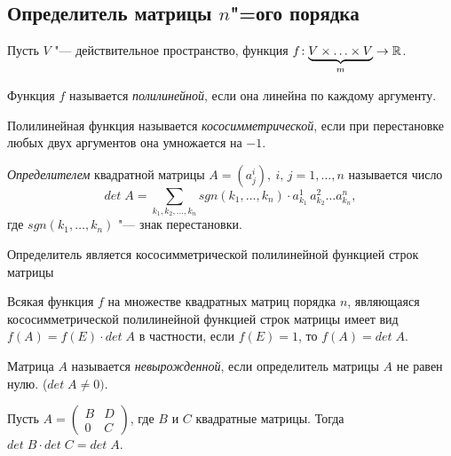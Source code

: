 \subsection*{Определитель матрицы $n$"=ого порядка}

Пусть $V$ "--- действительное пространство, функция $f\!: \underbrace{V \times \ldots \times V}_{m} \to \mathbb{R}$.
\begin{definition}
  Функция $f$ называется \textit{полилинейной}, если она линейна по каждому аргументу.
\end{definition}
\begin{definition}
  Полилинейная функция называется \textit{кососимметрической}, если при перестановке любых двух аргументов она умножается на $-1$.
\end{definition}

\begin{definition}
  \textit{Определителем} квадратной матрицы $A = (a_j^i),~ i,\,j = 1,\ldots,n$ называется число $$det\;A = \sum\limits_{k_1, k_2, \ldots, k_n}sgn(k_1, \ldots, k_n) \cdot a_{k_1}^1 \, a_{k_2}^2 \ldots a_{k_n}^n, $$
  где $sgn(k_1, \ldots, k_n)$ "--- знак перестановки.
\end{definition}

\begin{theorem}
  Определитель является кососимметрической полилинейной функцией строк матрицы 
  
  Всякая функция $f$ на множестве квадратных матриц порядка $n$, являющаяся кососимметрической полилинейной функцией строк матрицы имеет вид
  $f(A) = f(E) \cdot det\;A$ в частности, если $f(E) = 1$, то $f(A) = det\;A$.
\end{theorem}

\begin{definition}
  Матрица $A$ называется \textit{невырожденной}, если определитель матрицы $A$ не равен нулю. ($det\; A \neq 0)$.
\end{definition}
\begin{theorem}
  Пусть $A = \begin{pmatrix}
    B & D \\
    0 & C
  \end{pmatrix}$, где $B$ и $C$ квадратные матрицы. Тогда $det\;B \cdot det\;C = det\;A$.
\end{theorem}

